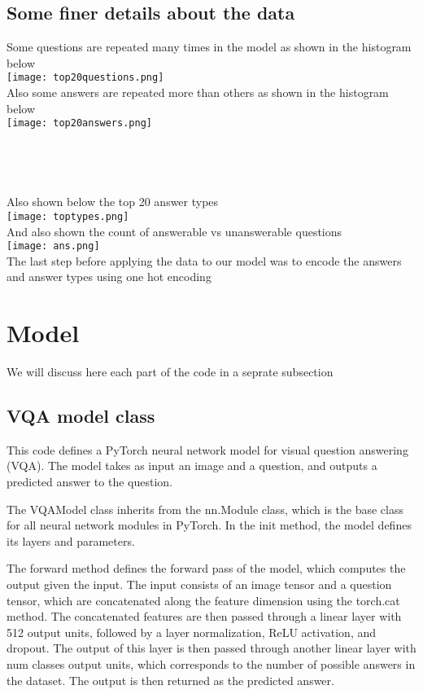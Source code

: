 \documentclass{report}
\begin{document}
\subsection{Some finer details about the data}
Some questions are repeated many times in the model as shown in the histogram below\\
\texttt{[image: top20questions.png]}\\
Also some answers are repeated more than others as shown in the histogram below\\
\texttt{[image: top20answers.png]}
\\\\\\\\\\Also shown below the top 20 answer types\\
\texttt{[image: toptypes.png]}
\\And also shown the count of answerable vs unanswerable questions\\
\texttt{[image: ans.png]}\\
The last step before applying the data to our model was to encode the answers and answer types using one hot encoding



\section{Model}
We will discuss here each part of the code in a seprate subsection
\subsection{VQA model class}
This code defines a PyTorch neural network model for visual question answering (VQA). The model takes as input an image and a question, and outputs a predicted answer to the question.

The VQAModel class inherits from the nn.Module class, which is the base class for all neural network modules in PyTorch. In the init method, the model defines its layers and parameters.

The forward method defines the forward pass of the model, which computes the output given the input. The input consists of an image tensor and a question tensor, which are concatenated along the feature dimension using the torch.cat method. The concatenated features are then passed through a linear layer with 512 output units, followed by a layer normalization, ReLU activation, and dropout. The output of this layer is then passed through another linear layer with num classes output units, which corresponds to the number of possible answers in the dataset. The output is then returned as the predicted answer.
\end{document}
